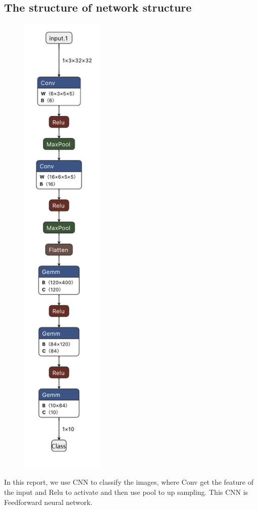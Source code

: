 \subsection{The structure of network structure}
\begin{figure}[H]
    \centering
    \includegraphics[width=4cm]{微信图片_20221127145950.png}
    \end{figure}
In this report, we use CNN to classify the images, where Conv get the feature of the input and Relu to activate and then use pool to up sampling. This CNN is Feedforward neural network.

